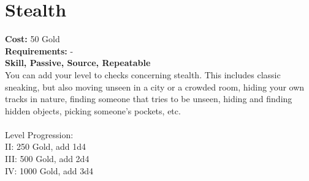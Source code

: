 \section{Stealth}
\textbf{Cost:} 50 Gold\\
\textbf{Requirements:} -\\
\textbf{Skill, Passive, Source, Repeatable}\\
You can add your level to checks concerning stealth. This includes classic sneaking, but also moving unseen in a city or a crowded room, hiding your own tracks in nature, finding someone that tries to be unseen, hiding and finding hidden objects, picking someone's pockets, etc.\\
\\
Level Progression:\\
II: 250 Gold, add 1d4\\
III: 500 Gold, add 2d4\\
IV: 1000 Gold, add 3d4\\